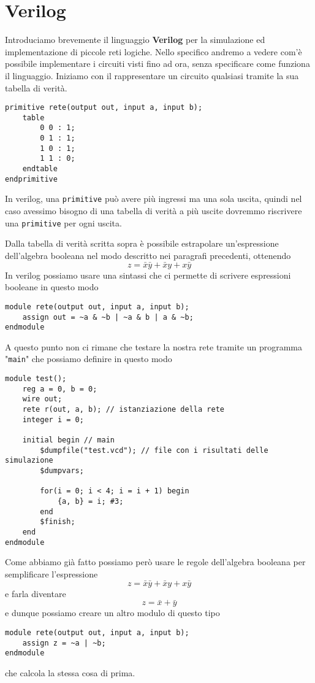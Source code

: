 \section{Verilog}
Introduciamo brevemente il linguaggio \textbf{Verilog} per la simulazione ed implementazione di
piccole reti logiche. Nello specifico andremo a vedere com'è possibile implementare i circuiti
visti fino ad ora, senza specificare come funziona il linguaggio. Iniziamo con il rappresentare un
circuito qualsiasi tramite la sua tabella di verità.
\begin{verbatim}
primitive rete(output out, input a, input b);
	table
		0 0 : 1;
		0 1 : 1;
		1 0 : 1;
		1 1 : 0;
	endtable
endprimitive
\end{verbatim}
In verilog, una \verb|primitive| può avere più ingressi ma una sola uscita, quindi nel caso
avessimo bisogno di una tabella di verità a più uscite dovremmo riscrivere una \verb|primitive| per
ogni uscita.

Dalla tabella di verità scritta sopra è possibile estrapolare un'espressione dell'algebra booleana
nel modo descritto nei paragrafi precedenti, ottenendo
\[ z = \bar{x} \bar{y} + \bar{x} y + x \bar{y} \]
In verilog possiamo usare una sintassi che ci permette di scrivere espressioni booleane in questo
modo
\begin{verbatim}
module rete(output out, input a, input b);
	assign out = ~a & ~b | ~a & b | a & ~b;
endmodule
\end{verbatim}
A questo punto non ci rimane che testare la nostra rete tramite un programma "\verb|main|" che
possiamo definire in questo modo
\begin{verbatim}
module test();
	reg a = 0, b = 0;
	wire out;
	rete r(out, a, b); // istanziazione della rete
	integer i = 0;
	
	initial begin // main
		$dumpfile("test.vcd"); // file con i risultati delle simulazione
		$dumpvars;

		for(i = 0; i < 4; i = i + 1) begin
            {a, b} = i; #3;
        end
    	$finish;
	end
endmodule
\end{verbatim}
Come abbiamo già fatto possiamo però usare le regole dell'algebra booleana per semplificare
l'espressione
\[ z = \bar{x} \bar{y} + \bar{x} y + x \bar{y} \]
e farla diventare
\[ z = \bar{x} + \bar{y} \]
e dunque possiamo creare un altro modulo di questo tipo
\begin{verbatim}
module rete(output out, input a, input b);
	assign z = ~a | ~b;
endmodule
\end{verbatim}
che calcola la stessa cosa di prima.


